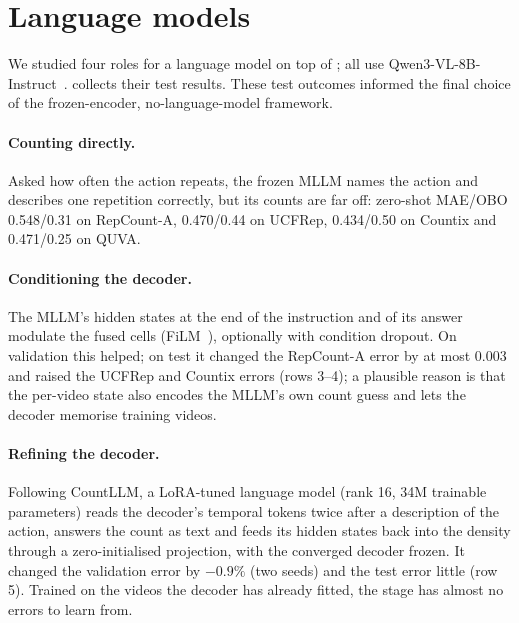 \section{Language models}
\label{app:lm}
We studied four roles for a language model on top of \method; all use
Qwen3-VL-8B-Instruct~\cite{qwen3vl}.  collects their test
results. These test outcomes informed the final choice of the frozen-encoder,
no-language-model framework.

\paragraph{Counting directly.} Asked how often the action repeats, the frozen MLLM
names the action and describes one repetition correctly, but its counts are far
off: zero-shot MAE/OBO 0.548/0.31 on RepCount-A, 0.470/0.44 on UCFRep,
0.434/0.50 on Countix and 0.471/0.25 on QUVA.

\paragraph{Conditioning the decoder.} The MLLM's hidden states at the end of the
instruction and of its answer modulate the fused cells (FiLM~\cite{perez2018film}),
optionally with condition dropout. On validation this helped; on test it changed
the RepCount-A error by at most 0.003 and raised the UCFRep and Countix errors
(rows 3--4); a plausible reason is that the per-video state also encodes the
MLLM's own count guess and lets the decoder memorise training videos.

\paragraph{Refining the decoder.} Following CountLLM, a LoRA-tuned language model
(rank 16, 34M trainable parameters) reads the decoder's temporal tokens twice
after a description of the action, answers the count as text and feeds its hidden
states back into the density through a zero-initialised projection, with the
converged decoder frozen. It changed the validation error by $-0.9\%$ (two seeds)
and the test error little (row 5). Trained on the videos the decoder has already
fitted, the stage has almost no errors to learn from.

